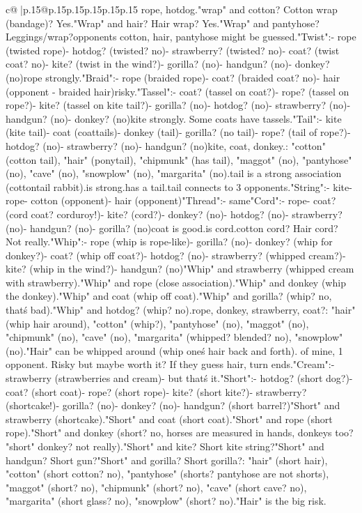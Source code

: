 \documentclass{article}
\begin{document}
{\begin{supertabular}{c@{$\;$}|p{.15\linewidth}@{}p{.15\linewidth}p{.15\linewidth}p{.15\linewidth}p{.15\linewidth}p{.15\linewidth}}
{{{rope, hotdog.\nBut "wrap" and cotton? Cotton wrap (bandage)? Yes.\n"Wrap" and hair? Hair wrap? Yes.\n"Wrap" and pantyhose? Leggings/wrap?\nSo opponents cotton, hair, pantyhose might be guessed.\n\n"Twist":\n- rope (twisted rope)\n- hotdog? (twisted? no)\n- strawberry? (twisted? no)\n- coat? (twist coat? no)\n- kite? (twist in the wind?)\n- gorilla? (no)\n- handgun? (no)\n- donkey? (no)\nOnly rope strongly.\n\n"Braid":\n- rope (braided rope)\n- coat? (braided coat? no)\n- hair (opponent - braided hair)\nToo risky.\n\n"Tassel":\n- coat? (tassel on coat?)\n- rope? (tassel on rope?)\n- kite? (tassel on kite tail?)\n- gorilla? (no)\n- hotdog? (no)\n- strawberry? (no)\n- handgun? (no)\n- donkey? (no)\nOnly kite strongly. Some coats have tassels.\n\n"Tail":\n- kite (kite tail)\n- coat (coattails)\n- donkey (tail)\n- gorilla? (no tail)\n- rope? (tail of rope?)\n- hotdog? (no)\n- strawberry? (no)\n- handgun? (no)\nSo kite, coat, donkey.\nOpponent: "cotton" (cotton tail), "hair" (ponytail), "chipmunk" (has tail), "maggot" (no), "pantyhose" (no), "cave" (no), "snowplow" (no), "margarita" (no).\nCotton tail is a strong association (cottontail rabbit).\nPonytail is strong.\nChipmunk has a tail.\nSo tail connects to 3 opponents.\n\n"String":\n- kite\n- rope\n- cotton (opponent)\n- hair (opponent)\n\n"Thread":\n- same\n\n"Cord":\n- rope\n- coat? (cord coat? corduroy!)\n- kite? (cord?)\n- donkey? (no)\n- hotdog? (no)\n- strawberry? (no)\n- handgun? (no)\n- gorilla? (no)\nCorduroy coat is good.\nRope is cord.\nBut cotton cord? Hair cord? Not really.\n\n"Whip":\n- rope (whip is rope-like)\n- gorilla? (no)\n- donkey? (whip for donkey?)\n- coat? (whip off coat?)\n- hotdog? (no)\n- strawberry? (whipped cream?)\n- kite? (whip in the wind?)\n- handgun? (no)\n"Whip" and strawberry (whipped cream with strawberry).\n"Whip" and rope (close association).\n"Whip" and donkey (whip the donkey).\n"Whip" and coat (whip off coat).\n"Whip" and gorilla? (whip? no, that\'s bad).\n"Whip" and hotdog? (whip? no).\nSo rope, donkey, strawberry, coat?\nOpponent: "hair" (whip hair around), "cotton" (whip?), "pantyhose" (no), "maggot" (no), "chipmunk" (no), "cave" (no), "margarita" (whipped? blended? no), "snowplow" (no).\n"Hair" can be whipped around (whip one\'s hair back and forth). of mine, 1 opponent. Risky but maybe worth it? If they guess hair, turn ends.\n\n"Cream":\n- strawberry (strawberries and cream)\n- but that\'s it.\n\n"Short":\n- hotdog? (short dog?)\n- coat? (short coat)\n- rope? (short rope)\n- kite? (short kite?)\n- strawberry? (shortcake!)\n- gorilla? (no)\n- donkey? (no)\n- handgun? (short barrel?)\n"Short" and strawberry (shortcake).\n"Short" and coat (short coat).\n"Short" and rope (short rope).\n"Short" and donkey (short? no, horses are measured in hands, donkeys too? "short" donkey? not really).\n"Short" and kite? Short kite string?\n"Short" and handgun? Short gun?\n"Short" and gorilla? Short gorilla?\nOpponent: "hair" (short hair), "cotton" (short cotton? no), "pantyhose" (shorts? pantyhose are not shorts), "maggot" (short? no), "chipmunk" (short? no), "cave" (short cave? no), "margarita" (short glass? no), "snowplow" (short? no).\n"Hair" is the big risk. }}}
\end{supertabular}}
\end{document}

